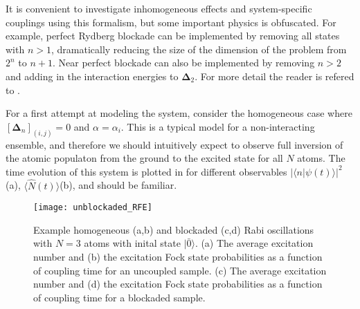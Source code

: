 It is convenient to investigate inhomogeneous effects and system-specific couplings using this formalism, but some important physics is obfuscated.
For example, perfect Rydberg blockade can be implemented by removing all states with $n > 1$, dramatically reducing the size of the dimension of the problem from $2^n$ to $n+1$.
Near perfect blockade can also be implemented by removing $n > 2$ and adding in the interaction energies to $\mathbf{\Delta}_2$.
For more detail the reader is refered to .

For a first attempt at modeling the system, consider the homogeneous case where $\left[\mathbf{\Delta}_{n}\right]_{(i,j)}=0$ and $\alpha = \alpha_i$.
This is a typical model for a non-interacting ensemble, and therefore we should intuitively expect to observe full inversion of the atomic populaton from the ground to the excited state for all $N$ atoms.
The time evolution of this system is plotted in  for different observables $|\langle n|\psi(t)\rangle|^2$(a), $\langle\hat{N}(t)\rangle$(b), and should be familiar.
\begin{figure}
  \label{fig_compositehomo}
  \texttt{[image: unblockaded\_RFE]}
  \caption{
    Example homogeneous (a,b) and blockaded (c,d) Rabi oscillations with $N=3$ atoms with inital state $|\bar{0}\rangle$.
    (a) The average excitation number and (b) the excitation Fock state probabilities as a function of coupling time for an uncoupled sample.
    (c) The average excitation number and (d) the excitation Fock state probabilities as a function of coupling time for a blockaded sample.
  }
\end{figure}

